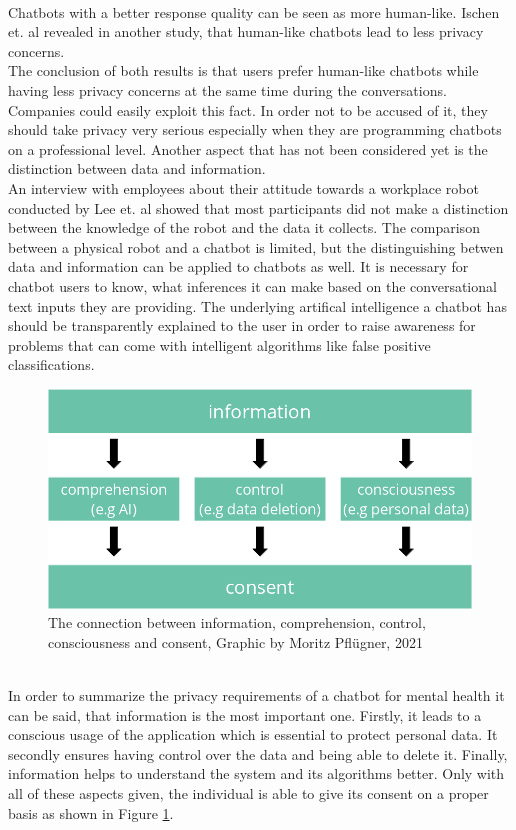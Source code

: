 \documentclass[sigconf, nonacm]{acmart}
\begin{document}
\\
Chatbots with a better response quality can be seen as more human-like. Ischen et. al \cite{Ischen} revealed in another study, that human-like chatbots lead to less privacy concerns.
\\
The conclusion of both results is that users prefer human-like chatbots while having less privacy concerns at the same time during the conversations. Companies could easily exploit this fact. In order not to be accused of it, they should take privacy very serious especially when they are programming chatbots on a professional level.  
Another aspect that has not been considered yet is the distinction between data and information.
\\
An interview with employees about their attitude towards a workplace robot conducted by Lee et. al \cite{Lee2011} showed that most participants did not make a distinction between the knowledge of the robot and the data it collects.
The comparison between a physical robot and a chatbot is limited, but the distinguishing betwen data and information can be applied to chatbots as well. It is necessary for chatbot users to know, what inferences it can make based on the conversational text inputs they are providing. The underlying artifical intelligence a chatbot has should be transparently explained 
to the user in order to raise awareness for problems that can come with intelligent algorithms like false positive classifications.
\begin{figure}[h]
  \centering
  \includegraphics[width=\linewidth]{privacy_base}
  \caption{The connection between information, comprehension, control, consciousness and consent, Graphic by Moritz Pflügner, 2021}
  \label{fig:privacy_base}
\end{figure}
\\
In order to summarize the privacy requirements of a chatbot for mental health it can be said, that information is the most important one. Firstly, it leads to a conscious usage of the application which is essential to protect personal data. It secondly ensures having control over the data and being able to delete it. Finally, information helps to understand the system and 
its algorithms better. Only with all of these aspects given, the individual is able to give its consent on a proper basis as shown in Figure \ref{fig:privacy_base}. 
\end{document}
